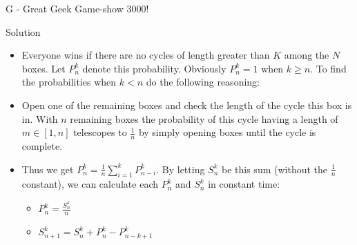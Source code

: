 \renewcommand{\insertshortauthor}{Jon Marius Venstad}
\begin{frame}{G - Great Geek Game-show 3000!}

\begin{block}{Solution}
  \begin{itemize}
	\item Everyone wins if there are no cycles of length greater than $K$ among the $N$ boxes. Let $P_n^k$ denote this probability. Obviously $P_n^k = 1$ when $k \geq n$. To find the probabilities when $k < n$ do the following reasoning:
	\item Open one of the remaining boxes and check the length of the cycle this box is in. With $n$ remaining boxes the probability of this cycle having a length of $m \in [1,n]$ telescopes to $\frac{1}{n}$ by simply opening boxes until the cycle is complete. 
	\item Thus we get $P_n^k = \frac{1}{n}\sum_{i=1}^{k}P_{n-i}^k$. By letting $S_n^k$ be this sum (without the $\frac{1}{n}$ constant), we can calculate each $P_n^k$ and $S_n^k$ in constant time:
	\begin{itemize}
		\item $P_n^k = \frac{S_n^k}{n}$
		\item $S_{n+1}^k = S_n^k + P_n^k - P_{n-k+1}^k$
	\end{itemize}
  \end{itemize}
\end{block}

\end{frame}

